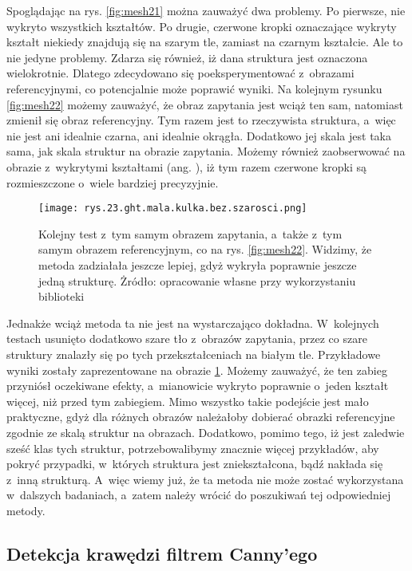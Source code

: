 Spoglądając na rys. \ref{fig:mesh21} można zauważyć dwa problemy. Po pierwsze, nie wykryto wszystkich kształtów. Po drugie, czerwone kropki oznaczające wykryty kształt niekiedy znajdują się na szarym tle, zamiast na czarnym kształcie. Ale to nie jedyne problemy. Zdarza się również, iż dana struktura jest oznaczona wielokrotnie. Dlatego zdecydowano się poeksperymentować z~obrazami referencyjnymi, co potencjalnie może poprawić wyniki. Na kolejnym rysunku \ref{fig:mesh22} możemy zauważyć, że obraz zapytania jest wciąż ten sam, natomiast zmienił się obraz referencyjny. Tym razem jest to rzeczywista struktura, a~więc nie jest ani idealnie czarna, ani idealnie okrągła. Dodatkowo jej skala jest taka sama, jak skala struktur na obrazie zapytania. Możemy również zaobserwować na obrazie z~wykrytymi kształtami (ang. ), iż tym razem czerwone kropki są rozmieszczone o~wiele bardziej precyzyjnie. 
\begin{figure}[h]
    \centering
    \texttt{[image: rys.23.ght.mala.kulka.bez.szarosci.png]}
    \caption{Kolejny test z~tym samym obrazem zapytania, a~także z~tym samym obrazem referencyjnym, co na rys. \ref{fig:mesh22}. Widzimy, że metoda zadziałała jeszcze lepiej, gdyż wykryła poprawnie jeszcze jedną strukturę. Żródło: opracowanie własne przy wykorzystaniu biblioteki }
    \label{fig:mesh23}
\end{figure}
Jednakże wciąż metoda ta nie jest na wystarczająco dokładna. W~kolejnych testach usunięto dodatkowo szare tło z~obrazów zapytania, przez co szare struktury znalazły się po tych przekształceniach na białym tle. Przykładowe wyniki zostały zaprezentowane na obrazie \ref{fig:mesh23}. Możemy zauważyć, że ten zabieg przyniósł oczekiwane efekty, a~mianowicie wykryto poprawnie o~jeden kształt więcej, niż przed tym zabiegiem.
Mimo wszystko takie podejście jest mało praktyczne, gdyż dla różnych obrazów należałoby dobierać obrazki referencyjne zgodnie ze skalą struktur na obrazach. Dodatkowo, pomimo tego, iż jest zaledwie sześć klas tych struktur, potrzebowalibymy znacznie więcej przykładów, aby pokryć przypadki, w~których struktura jest zniekształcona, bądź nakłada się z~inną strukturą. A~więc wiemy już, że ta metoda nie może zostać wykorzystana w~dalszych badaniach, a~zatem należy wrócić do poszukiwań tej odpowiedniej metody.

\subsection{Detekcja krawędzi filtrem Canny'ego}
\label{canny}

